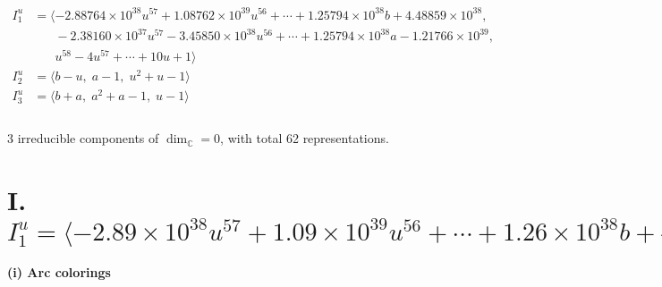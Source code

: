 \documentclass[1p]{elsarticle_modified}
\theoremstyle{definition}
\begin{document}
\begin{align*}
I^u_{1}&=\langle 
-2.88764\times10^{38} u^{57}+1.08762\times10^{39} u^{56}+\cdots+1.25794\times10^{38} b+4.48859\times10^{38},\\
\phantom{I^u_{1}}&\phantom{= \langle  }-2.38160\times10^{37} u^{57}-3.45850\times10^{38} u^{56}+\cdots+1.25794\times10^{38} a-1.21766\times10^{39},\\
\phantom{I^u_{1}}&\phantom{= \langle  }u^{58}-4 u^{57}+\cdots+10 u+1\rangle \\
I^u_{2}&=\langle 
b- u,\;a-1,\;u^2+u-1\rangle \\
I^u_{3}&=\langle 
b+a,\;a^2+a-1,\;u-1\rangle \\
\\
\end{align*}
\raggedright * 3 irreducible components of $\dim_{\mathbb{C}}=0$, with total 62 representations.\\
\newpage
\renewcommand{\arraystretch}{1}
\centering \section*{I. $I^u_{1}= \langle -2.89\times10^{38} u^{57}+1.09\times10^{39} u^{56}+\cdots+1.26\times10^{38} b+4.49\times10^{38},\;-2.38\times10^{37} u^{57}-3.46\times10^{38} u^{56}+\cdots+1.26\times10^{38} a-1.22\times10^{39},\;u^{58}-4 u^{57}+\cdots+10 u+1 \rangle$}
\flushleft \textbf{(i) Arc colorings}\\
\end{document}
